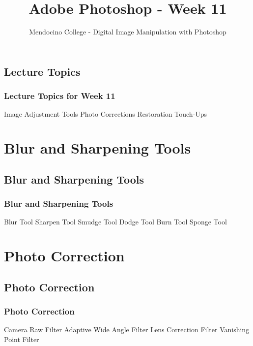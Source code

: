 \documentclass{beamer}
\title{Adobe Photoshop - Week 11}
\author{Mendocino College - Digital Image Manipulation with Photoshop}
\date{\vspace{-5em}}
\begin{document}
	{
		\begin{frame}
			\vspace{-35pt}
			\maketitle
		\end{frame}
	}

	\section{}
			\subsection{Lecture Topics}		
	\begin{frame}
		\frametitle{Lecture Topics for Week 11}
				\begin{outline}
					\1 Image Adjustment Tools
					\1 Photo Corrections
					\1 Restoration
					\1 Touch-Ups
				\end{outline}
		\end{frame}

	\section{Blur and Sharpening Tools}
			\subsection{Blur and Sharpening Tools}		
				\begin{frame}
					\frametitle{Blur and Sharpening Tools}
					\begin{outline}
						\1 Blur Tool
						\1 Sharpen Tool
						\1 Smudge Tool
						\1 Dodge Tool
						\1 Burn Tool
						\1 Sponge Tool
					\end{outline}
				\end{frame}
			
	\section{Photo Correction}
		\subsection{Photo Correction}		
			\begin{frame}
				\frametitle{Photo Correction}
				\begin{outline}
					\1 Camera Raw Filter
					\1 Adaptive Wide Angle Filter
					\1 Lens Correction Filter
					\1 Vanishing Point Filter
				\end{outline}
			\end{frame}
			
\end{document}
